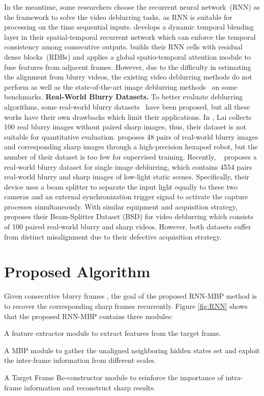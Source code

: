 \documentclass[letterpaper]{article} \usepackage{aaai22}  \usepackage{times}  \usepackage{helvet}  \usepackage{courier}  \usepackage[hyphens]{url}  \usepackage{graphicx} \urlstyle{rm} \def\UrlFont{\rm}  \usepackage{natbib}  \usepackage{caption} \DeclareCaptionStyle{ruled}{labelfont=normalfont,labelsep=colon,strut=off} \frenchspacing  \setlength{\pdfpagewidth}{8.5in}  \setlength{\pdfpageheight}{11in}  \newcommand{\hang}{\textcolor[rgb]{0.98,0.5,0.04}}
\begin{document}
In the meantime, 
some researchers choose the recurrent neural network~(RNN) as the framework to solve the video deblurring tasks,
as RNN is suitable for processing on the time sequential inputs.
\cite{Kim_2017_ICCV} develops a dynamic temporal blending layer in their spatial-temporal recurrent network which can enforce the temporal consistency among consecutive outputs.
\cite{ESTRNN} builds their RNN cells with residual dense blocks~(RDBs) and applies a global spatio-temporal attention module to fuse features from adjacent frames.
However, due to the difficulty in estimating the alignment from blurry videos, the existing video deblurring methods do not perform as well as the state-of-the-art image deblurring methods~\cite{Zamir2021MPRNet, Chen_2021_CVPR} on some benchmarks.
\newline
{\bf Real-World Blurry Datasets.} 
To better evaluate deblurring algorithms, some real-world blurry datasets~\cite{lai_blur, kohler, RealBlur, ESTRNN} have been proposed,
but all these works have their own drawbacks which limit their applications. 
In \cite{lai_blur}, Lai collects 100 real blurry images without paired sharp images, thus, their dataset is not suitable for quantitative evaluation.\cite{kohler} proposes 48 pairs of real-world blurry images and corresponding sharp images through a high-precision hexapod robot, but the number of their dataset is too few for supervised training. 
Recently, ~\cite{RealBlur} proposes a real-world blurry dataset for single image deblurring, which contains 4554 pairs real-world blurry and sharp images of low-light static scenes.
Specifically, their device uses a beam splitter to separate the input light equally to these two cameras and an external synchronization trigger signal to activate the capture processes simultaneously.
With similar equipment and acquisition strategy, ~\cite{ESTRNN} proposes their Beam-Splitter Dataset (BSD) for video deblurring which consists of 100 paired real-world blurry and sharp videos. 
However, both datasets suffer from distinct misalignment due to their defective acquisition strategy.


\section{Proposed Algorithm}
Given consecutive blurry frames , the goal of the proposed RNN-MBP method is to recover the corresponding sharp frames  recurrently.
Figure \ref{fig:RNN} shows that the proposed RNN-MBP contains three modules:
\begin{compactitem}
    \item A feature extractor module to extract features from the target frame.
    \item A MBP module to gather the unaligned neighboring hidden states set and exploit the inter-frame information from different scales.
    \item A Target Frame Re-constructor module to reinforce the importance of intra-frame information and reconstruct sharp results.
\end{compactitem}
\end{document}
